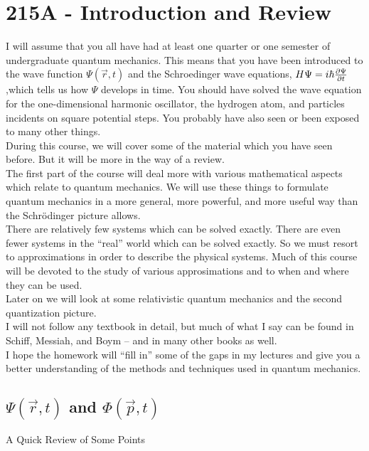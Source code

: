 \section{215A - Introduction and Review}

I will assume that you all have had at least one quarter or one semester of undergraduate quantum mechanics.
This means that you have been introduced to the wave function $\Psi(\vec r,t)$ and the Schroedinger wave equations, 
$H\Psi = i\hbar {\partial \Psi\over \partial t}$,which tells us how $\Psi$ develops in time. You should have solved the wave
equation for the one-dimensional harmonic oscillator, the hydrogen atom, and particles incidents on square potential steps.
You probably have also seen or been exposed to many other things.\\

During this course, we will cover some of the material which you have seen before. But it will be more in the way of a review.\\

The first part of the course will deal more with various mathematical aspects which relate to quantum mechanics. We will use these things to 
formulate quantum mechanics in a more general, more powerful, and more useful way than the Schr\"odinger picture allows.\\

There are relatively few systems which can be solved exactly. There are even fewer systems in the ``real'' world which can 
be solved exactly. So we must resort to approximations in order to describe the physical systems. Much of this course will 
be devoted to the study of various approsimations and to when and where they can be used. \\

Later on we will look at some relativistic quantum mechanics and the second quantization picture.\\ 

I will not follow any textbook in detail, but much of what I say can be found in Schiff, Messiah, and Boym -- and in many other books as well.\\

I hope the homework will ``fill in'' some of the gaps in my lectures and give you a better understanding of the methods and techniques used
in quantum mechanics.
 
\subsection{$\Psi(\vec{r},t)$  and $\Phi(\vec{p},t)$ }
 \centerline{A Quick Review of Some Points}
  
